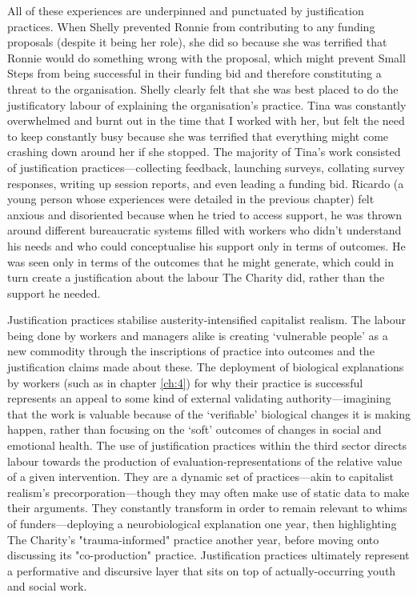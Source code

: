 All of these experiences are underpinned and punctuated by justification practices. When Shelly prevented Ronnie from contributing to any funding proposals (despite it being her role), she did so because she was terrified that Ronnie would do something wrong with the proposal,  which might prevent Small Steps from being successful in their funding bid and therefore constituting a threat to the organisation. Shelly clearly felt that she was best placed to do the justificatory labour of explaining the organisation's practice. Tina was constantly overwhelmed and burnt out in the time that I worked with her, but felt the need to keep constantly busy because she was terrified that everything might come crashing down around her if she stopped. The majority of Tina's work consisted of justification practices—collecting feedback, launching surveys, collating survey responses, writing up session reports, and even leading a funding bid. Ricardo (a young person whose experiences were detailed in the previous chapter) felt anxious and disoriented because when he tried to access support, he was thrown around different bureaucratic systems filled with workers who didn't understand his needs and who could conceptualise his support only in terms of outcomes. He was seen only in terms of the outcomes that he might generate, which could in turn create a justification about the labour The Charity did, rather than the support he needed.

Justification practices stabilise austerity-intensified capitalist realism. The labour being done by workers and managers alike is creating `vulnerable people' as a new commodity through the inscriptions of practice into outcomes and the justification claims made about these. The deployment of biological explanations by workers (such as in chapter \ref{ch:4}) for why their practice is successful represents an appeal to some kind of external validating authority—imagining that the work is valuable because of the `verifiable' biological changes it is making happen, rather than focusing on the `soft' outcomes of changes in social and emotional health. The use of justification practices within the third sector directs labour towards the production of evaluation-representations of the relative value of a given intervention. They are a dynamic set of practices—akin to capitalist realism's precorporation—though they may often make use of static data to make their arguments. They constantly transform in order to remain relevant to whims of funders—deploying a neurobiological explanation one year, then highlighting The Charity's "trauma-informed" practice another year, before moving onto discussing its "co-production" practice. Justification practices ultimately represent a performative and discursive layer that sits on top of actually-occurring youth and social work.

